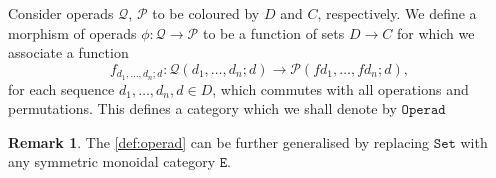 \documentclass[11pt, reqno]{amsart}
\theoremstyle{definition}
\newtheorem{remark}[theorem]{Remark}
\newcommand{\cat}{\texttt}
\newcommand{\catfont}{\texttt}
\newcommand{\Set}{{\catfont{Set}}}          %
\newcommand{\operad}{\mathcal}
\newcommand{\Operad}{{\catfont{Operad}}}
\begin{document}
Consider operads \(\operad Q\), \(\operad P\) to be coloured by \(D\) and \(C\),
respectively. We define a morphism of operads \(\phi: \operad Q \to \operad P\) to be
a function of sets \(D \to C\) for which we associate a function
\[
f_{d_1, \dots, d_n; d}: \operad Q(d_1, \dots, d_n; d)
\longrightarrow
\operad P(f d_1, \dots, f d_n; d),
\]
for each sequence \(d_1, \dots, d_n, d \in D\), which commutes with all operations
and permutations. This defines a category which we shall denote by \(\Operad\)

\begin{remark}
\label{rem:operad-set-to-sym-mon-cat}
The \cref{def:operad} can be further generalised by replacing \(\Set\) with any
symmetric monoidal category \(\cat E\).
\end{remark}



\end{document}
